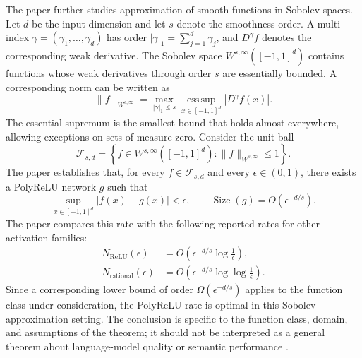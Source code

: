 The paper further studies approximation of smooth functions in
Sobolev spaces. Let \(d\) be the input dimension and let \(s\) denote
the smoothness order. A multi-index
\(\gamma=(\gamma_1,\ldots,\gamma_d)\) has order
\(|\gamma|_1=\sum_{j=1}^{d}\gamma_j\), and
\(D^\gamma f\) denotes the corresponding weak derivative. The
Sobolev space \(W^{s,\infty}([-1,1]^d)\) contains functions whose
weak derivatives through order \(s\) are essentially bounded. A
corresponding norm can be written as
\begin{equation}
    \|f\|_{W^{s,\infty}}
    =
    \max_{|\gamma|_1\leq s}
    \operatorname*{ess\,sup}_{x\in[-1,1]^d}
    |D^\gamma f(x)|.
    \label{eq:act-sobolev-norm}
\end{equation}
The essential supremum is the smallest bound that holds almost
everywhere, allowing exceptions on sets of measure zero. Consider
the unit ball
\begin{equation}
    \mathcal{F}_{s,d}
    =
    \left\{
        f\in W^{s,\infty}([-1,1]^d):
        \|f\|_{W^{s,\infty}}\leq1
    \right\}.
    \label{eq:act-sobolev-ball}
\end{equation}
The paper establishes that, for every \(f\in\mathcal{F}_{s,d}\)
and every \(\epsilon\in(0,1)\), there exists a PolyReLU network
\(g\) such that
\begin{equation}
    \sup_{x\in[-1,1]^d}|f(x)-g(x)|<\epsilon,
    \qquad
    \operatorname{Size}(g)=O(\epsilon^{-d/s}).
    \label{eq:act-polyrelu-sobolev-rate}
\end{equation}
The paper compares this rate with the following reported rates for
other activation families:
\begin{align}
    N_{\mathrm{ReLU}}(\epsilon)
    &=O\left(\epsilon^{-d/s}\log\frac{1}{\epsilon}\right),
    \label{eq:act-relu-sobolev-rate}
    \\
    N_{\mathrm{rational}}(\epsilon)
    &=O\left(\epsilon^{-d/s}\log\log\frac{1}{\epsilon}\right).
    \label{eq:act-rational-sobolev-rate}
\end{align}
Since a corresponding lower bound of order
\(\Omega(\epsilon^{-d/s})\) applies to the function class under
consideration, the PolyReLU rate is optimal in this Sobolev
approximation setting. The conclusion is specific
to the function class, domain, and assumptions of the theorem; it
should not be interpreted as a general theorem about language-model
quality or semantic performance \parencite{zhuo2025polycom}.

